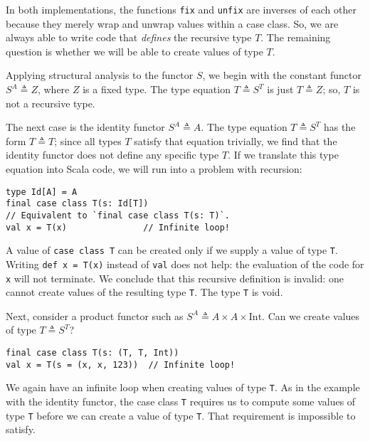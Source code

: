 In both implementations, the functions \lstinline!fix! and \lstinline!unfix!
are inverses of each other because they merely wrap and unwrap values
within a case class. So, we are always able to write code that \emph{defines}
the recursive type $T$. The remaining question is whether we will
be able to create values of type $T$.

Applying structural analysis to the functor $S$, we begin with the
constant functor $S^{A}\triangleq Z$, where $Z$ is a fixed type.
The type equation $T\triangleq S^{T}$ is just $T\triangleq Z$; so,
$T$ is not a recursive type.

The next case is the identity functor $S^{A}\triangleq A$. The type
equation $T\triangleq S^{T}$ has the form $T\triangleq T$; since
all types $T$ satisfy that equation trivially, we find that the identity
functor does not define any specific type $T$. If we translate this
type equation into Scala code, we will run into a problem with recursion:
\begin{lstlisting}
type Id[A] = A
final case class T(s: Id[T])
// Equivalent to `final case class T(s: T)`.
val x = T(x)               // Infinite loop!
\end{lstlisting}
A value of \lstinline!case class T! can be created only if we supply
a value of type \lstinline!T!. Writing \lstinline!def x = T(x)!
instead of \lstinline!val! does not help: the evaluation of the code
for \lstinline!x! will not terminate. We conclude that this recursive
definition is invalid: one cannot create values of the resulting type
\lstinline!T!. The type \lstinline!T! is void.

Next, consider a product functor such as $S^{A}\triangleq A\times A\times\text{Int}$.
Can we create values of type $T\triangleq S^{T}$?
\begin{lstlisting}
final case class T(s: (T, T, Int))
val x = T(s = (x, x, 123))  // Infinite loop!
\end{lstlisting}
We again have an infinite loop when creating values of type \lstinline!T!.
As in the example with the identity functor, the case class \lstinline!T!
requires us to compute some values of type \lstinline!T! before we
can create a value of type \lstinline!T!. That requirement is impossible
to satisfy.

